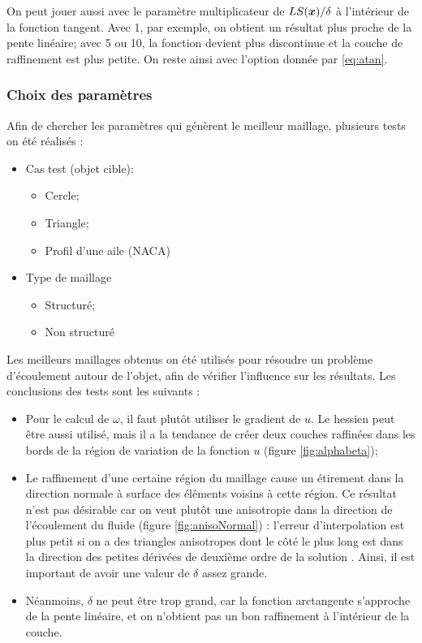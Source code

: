 \indent

\indent On peut jouer aussi avec le paramètre multiplicateur de \(LS(\boldsymbol{x})/\delta\) à l'intérieur de la fonction tangent. Avec 1, par exemple, on obtient un résultat plus proche de la pente linéaire; avec 5 ou 10, la fonction devient plus discontinue et la couche de raffinement est plus petite. On reste ainsi avec l'option donnée par \eqref{eq:atan}.



\subsubsection{Choix des paramètres}

\indent Afin de chercher les paramètres qui génèrent le meilleur maillage, plusieurs tests on été réalisés : 

\begin{itemize}
	\item Cas test (objet cible): 
	\begin{itemize}
		\item Cercle;
		\item Triangle;
		\item Profil d'une aile (NACA)
	\end{itemize}
	\item Type de maillage
	\begin{itemize}
		\item Structuré;
		\item Non structuré
	\end{itemize}
\end{itemize}

\indent Les meilleurs maillages obtenus on été utilisés pour résoudre un problème d'écoulement autour de l'objet, afin de vérifier l'influence sur les résultats. Les conclusions des tests sont les suivants : 

\begin{itemize}
  \item Pour le calcul de \(\omega\), il faut plutôt utiliser le gradient de \(u\). Le hessien peut être aussi utilisé, mais il a la tendance de créer deux couches raffinées dans les bords de la région de variation de la fonction \(u\) (figure \ref{fig:alphabeta});
  \item Le raffinement d'une certaine région du maillage cause un étirement dans la direction normale à surface des éléments voisins à cette région. Ce résultat n'est pas désirable car on veut plutôt une anisotropie dans la direction de l'écoulement du fluide (figure \ref{fig:anisoNormal}) : l'erreur d'interpolation est plus petit si on a des triangles anisotropes dont le côté le plus long est dans la direction des petites dérivées de deuxième ordre de la solution \cite{rippa}. Ainsi, il est important de avoir une valeur de \(\delta\) assez grande.
  \item Néanmoins, \(\delta\) ne peut être trop grand, car la fonction arctangente s'approche de la pente linéaire, et on n'obtient pas un bon raffinement à l'intérieur de la couche.
\end{itemize}


